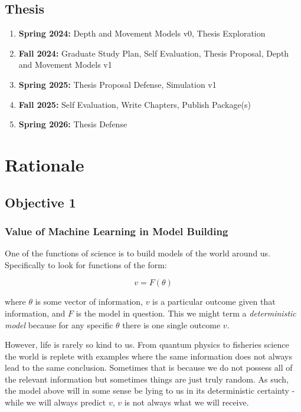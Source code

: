 \documentclass[11pt]{article}
\begin{document}
\subsection{Thesis}

\begin{enumerate}
\item \textbf{Spring 2024:} Depth and Movement Models v0, Thesis Exploration
\item \textbf{Fall 2024:} Graduate Study Plan, Self Evaluation, Thesis Proposal, Depth and Movement Models v1
\item \textbf{Spring 2025:} Thesis Proposal Defense, Simulation v1
\item \textbf{Fall 2025:} Self Evaluation, Write Chapters, Publish Package(s)
\item \textbf{Spring 2026:} Thesis Defense
\end{enumerate}

\newpage


















\section{Rationale}

\subsection{Objective 1}

\subsubsection{Value of Machine Learning in Model Building}

One of the functions of science is to build models of the world around us. Specifically to look for functions of the form:

$$v=F(\theta)$$

where $\theta$ is some vector of information, $v$ is a particular outcome given that information, and $F$ is the model in question. This we might term a \textit{deterministic model} because for any specific $\theta$ there is one single outcome $v$. 

However, life is rarely so kind to us. From quantum physics to fisheries science the world is replete with examples where the same information does not always lead to the same conclusion. Sometimes that is because we do not possess all of the relevant information but sometimes things are just truly random. As such, the model above will in some sense be lying to us in its deterministic certainty - while we will always predict $v$, $v$ is not always what we will receive. 
\end{document}
